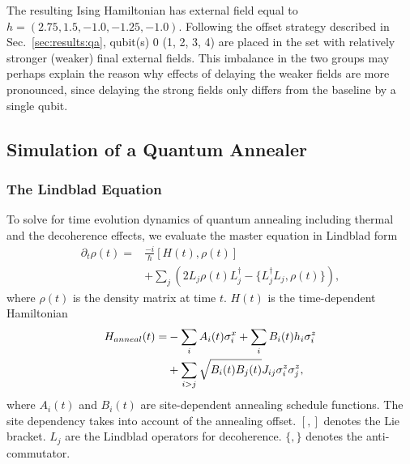 \documentclass[prd,twocolumn,tightenlines,preprintnumbers,showpacs,superscriptaddress,notitlepage,nofootinbib,eqsecnum,floatfix,longbibliography,aps,10pt]{revtex4-2}
\begin{document}
The resulting Ising Hamiltonian has external field equal to $h = (2.75, 1.5, -1.0, -1.25, -1.0)$.
Following the offset strategy described in Sec.~\ref{sec:results:qa}, qubit(s) 0 (1, 2, 3, 4) are placed in the set with relatively stronger (weaker) final external fields.
This imbalance in the two groups may perhaps explain the reason why effects of delaying the weaker fields are more pronounced, since delaying the strong fields only differs from the baseline by a single qubit.



\subsection{Simulation of a Quantum Annealer}
\label{sec:methods:simulation}

\subsubsection{The Lindblad Equation}
\label{sec:methods:lindblad}

To solve for time evolution dynamics of quantum annealing including thermal and the decoherence effects, we evaluate the master equation in Lindblad form
\begin{align}
 \partial_t \rho (t) = &  \frac{-i}{\hbar} \left[H(t) , \rho(t)\right] \nonumber \\
 & + \sum_j \left(2L_j \rho(t) L_j^\dagger - \{ L^\dagger_j L_j, \rho(t) \}\right) ,
\end{align}
where $\rho (t)$ is the density matrix at time $t$.
$H(t)$ is the time-dependent Hamiltonian
\begin{align}
 \label{eq:annealH}
 H_{anneal}(t)  = & - \sum_i  A_i(t)\sigma^x_i +\sum_i B_{i}(t) h_i \sigma^z_i \notag \\
 & + \sum_{i>j} \sqrt{B_{i}(t)B_{j}(t)} J_{ij} \sigma^z_i \sigma^z_j  ,
\end{align}
where $A_i(t)$ and $B_{i}(t)$ are site-dependent annealing schedule functions.
The site dependency takes into account of the annealing offset.
$[,]$ denotes the Lie bracket.
$L_j$ are the Lindblad operators for decoherence.
$\{, \}$ denotes the anti-commutator.
\end{document}
